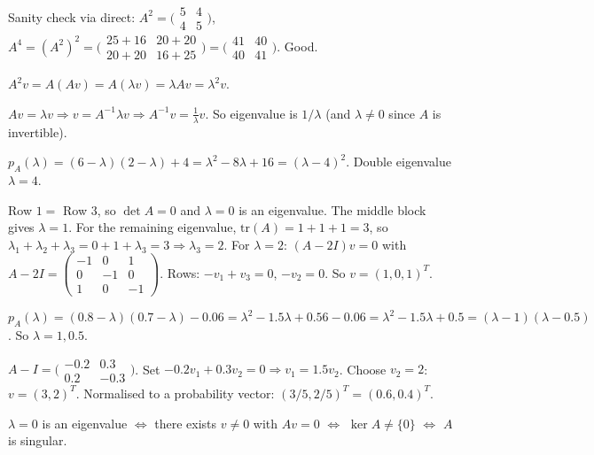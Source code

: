 \begin{solutions}
\[  \]
  Sanity check via direct: $A^{2} = \bigl(\begin{smallmatrix} 5 & 4 \\ 4 & 5 \end{smallmatrix}\bigr)$, $A^{4} = (A^{2})^{2} = \bigl(\begin{smallmatrix} 25 + 16 & 20 + 20 \\ 20 + 20 & 16 + 25 \end{smallmatrix}\bigr) = \bigl(\begin{smallmatrix} 41 & 40 \\ 40 & 41 \end{smallmatrix}\bigr)$. Good.
  \item $A^{2} v = A(A v) = A(\lambda v) = \lambda A v = \lambda^{2} v$.
  \item $A v = \lambda v \Rightarrow v = A^{-1} \lambda v \Rightarrow A^{-1} v = \tfrac{1}{\lambda} v$. So eigenvalue is $1/\lambda$ (and $\lambda \neq 0$ since $A$ is invertible).
  \item $p_{A}(\lambda) = (6 - \lambda)(2 - \lambda) + 4 = \lambda^{2} - 8 \lambda + 16 = (\lambda - 4)^{2}$. Double eigenvalue $\lambda = 4$.
  \item Row $1 = $ Row $3$, so $\det A = 0$ and $\lambda = 0$ is an eigenvalue. The middle block gives $\lambda = 1$. For the remaining eigenvalue, $\mathrm{tr}(A) = 1 + 1 + 1 = 3$, so $\lambda_{1} + \lambda_{2} + \lambda_{3} = 0 + 1 + \lambda_{3} = 3 \Rightarrow \lambda_{3} = 2$.
  For $\lambda = 2$: $(A - 2 I)v = 0$ with $A - 2 I = \begin{pmatrix} -1 & 0 & 1 \\ 0 & -1 & 0 \\ 1 & 0 & -1 \end{pmatrix}$. Rows: $-v_{1} + v_{3} = 0$, $-v_{2} = 0$. So $v = (1, 0, 1)^{T}$.
  \item $p_{A}(\lambda) = (0.8 - \lambda)(0.7 - \lambda) - 0.06 = \lambda^{2} - 1.5 \lambda + 0.56 - 0.06 = \lambda^{2} - 1.5 \lambda + 0.5 = (\lambda - 1)(\lambda - 0.5)$. So $\lambda = 1, 0.5$.
  \item $A - I = \bigl(\begin{smallmatrix} -0.2 & 0.3 \\ 0.2 & -0.3 \end{smallmatrix}\bigr)$. Set $-0.2 v_{1} + 0.3 v_{2} = 0 \Rightarrow v_{1} = 1.5 v_{2}$. Choose $v_{2} = 2$: $v = (3, 2)^{T}$. Normalised to a probability vector: $(3/5, 2/5)^{T} = (0.6, 0.4)^{T}$.
  \item $\lambda = 0$ is an eigenvalue $\Leftrightarrow$ there exists $v \neq 0$ with $A v = 0$ $\Leftrightarrow$ $\ker A \neq \{0\}$ $\Leftrightarrow$ $A$ is singular.

\end{solutions}
